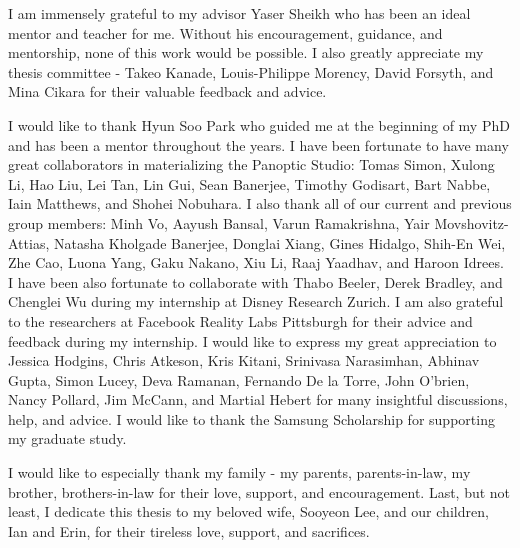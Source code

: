 \begin{acknowledgements}
I am immensely grateful to my advisor Yaser Sheikh who has been an ideal mentor and teacher for me. Without his encouragement, guidance, and mentorship, none of this work would be possible. I also greatly appreciate my thesis committee - Takeo Kanade,  Louis-Philippe Morency, David Forsyth, and Mina Cikara for their valuable feedback and advice.

I would like to thank Hyun Soo Park who guided me at the beginning of my PhD and has been a mentor throughout the years. I have been fortunate to have many great collaborators in materializing the Panoptic Studio: Tomas Simon, Xulong Li, Hao Liu, Lei Tan, Lin Gui, Sean Banerjee, Timothy Godisart, Bart Nabbe, Iain Matthews, and Shohei Nobuhara. I also thank all of our current and previous group members: Minh Vo, Aayush Bansal, Varun Ramakrishna, Yair Movshovitz-Attias, Natasha Kholgade Banerjee, Donglai Xiang, Gines Hidalgo, Shih-En Wei, Zhe Cao, Luona Yang, Gaku Nakano, Xiu Li, Raaj Yaadhav, and Haroon Idrees. I have been also fortunate to collaborate with Thabo Beeler, Derek Bradley, and Chenglei Wu during my internship at Disney Research Zurich. I am also grateful to the researchers at Facebook Reality Labs Pittsburgh for their advice and feedback during my internship. I would like to express my great appreciation to Jessica Hodgins, Chris Atkeson, Kris Kitani, Srinivasa Narasimhan, Abhinav Gupta, Simon Lucey, Deva Ramanan, Fernando De la Torre, John O’brien, Nancy Pollard, Jim McCann, and Martial Hebert for many insightful discussions, help, and advice. I would like to thank the Samsung Scholarship for supporting my graduate study.

I would like to especially thank my family - my parents, parents-in-law, my brother, brothers-in-law for their love, support, and encouragement. Last, but not least, I dedicate this thesis to my beloved wife, Sooyeon Lee, and our children, Ian and Erin, for their tireless love, support, and sacrifices. 
\end{acknowledgements}